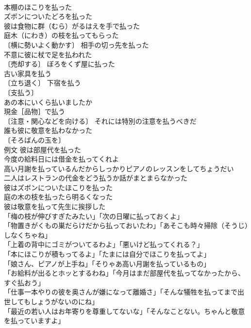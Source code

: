 \documentclass[8pt]{extreport}
\begin{document}
\begin{CJK}{UTF8}{min}
\\	本棚のほこりを払った 
\\	ズボンについたどろを払った 
\\	彼は食物に群（むら）がるはえを手で払った 
\\	庭木（にわき）の枝を払ってもらった 
\\	〔横に勢いよく動かす〕 相手の切っ先を払った 
\\	不意に彼に杖で足を払われた 
\\	〔売却する〕 ぼろをくず屋に払った 
\\	古い家具を払う 
\\	〔立ち退く〕 下宿を払う 
\\	〔支払う〕
\\	あの本にいくら払いましたか 
\\	現金［品物］で払う 
\\	〔注意・関心などを向ける〕 それには特別の注意を払うべきだ 
\\	誰も彼に敬意を払わなかった 
\\	〔そろばんの玉を〕
\\	例文 彼は部屋代を払った 
\\	今度の給料日には借金を払ってくれよ 
\\	高い月謝を払っているんだからしっかりピアノのレッスンをしてちょうだい 
\\	二人はレストランの代金をどう払うか話がまとまらなかった 
\\	彼はズボンについたほこりを払った 
\\	庭の木の枝を払ったら明るくなった 
\\	彼は敬意を払って先生に挨拶した 
\\	「梅の枝が伸びすぎたみたい」「次の日曜に払っておくよ」 
\\	「物置きがくもの巣だらけだから払っておいたわ」「あそこも時々掃除（そうじ）しなくちゃね」 
\\	「上着の背中にゴミがついてるわよ」「悪いけど払ってくれる？」 
\\	「本にほこりが積もってるよ」「たまには自分でほこりを払ってよ」 
\\	「娘さん、ピアノが上手ね」「そりゃあ高い月謝を払っているもの」 
\\	「お給料が出るとホッとするわね」「今月はまだ部屋代を払ってなかったから、すぐ払おう」 
\\	「仕事一本やりの彼を奥さんが嫌になって離婚さ」「そんな犠牲を払ってまで出世してもしょうがないのにね」 
\\	「最近の若い人はお年寄りを尊重してないな」「そんなことない。ちゃんと敬意を払っていますよ」 

\end{CJK}
\end{document}
